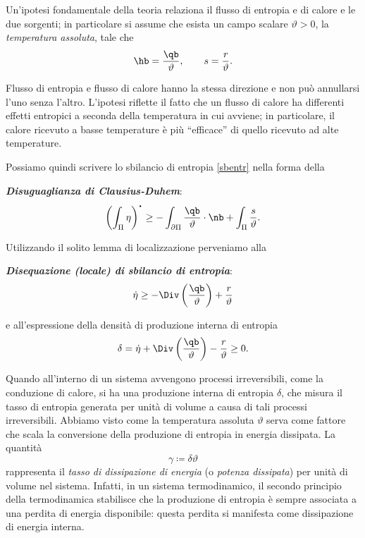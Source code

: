 Un'ipotesi fondamentale della teoria relaziona il flusso di entropia e di calore e le due sorgenti; in particolare si assume che esista un campo scalare $\vartheta>0$, la \textit{temperatura assoluta}, tale
 che
 \begin{equation}
 \hb =\frac{\qb}{\vartheta}, \qquad s=\frac{r}{\vartheta}.
 \end{equation}
 
 Flusso di entropia e flusso di calore hanno la stessa direzione e non può annullarsi l'uno senza l'altro. L'ipotesi riflette il fatto che un flusso di calore ha differenti effetti entropici a seconda della temperatura in cui avviene; in particolare, il calore ricevuto a basse temperature è più ``efficace'' di quello ricevuto ad alte temperature.
 
 Possiamo quindi scrivere lo sbilancio di entropia \eqref{sbentr} nella forma della
 
 \begin{definition}
 \noindent \textbf{\textit{Disuguaglianza di Clausius-Duhem}}:
 \begin{equation}
 	\left( \int_{\Pi}\eta \right)^{\mathop{\vcenter{\hbox{\Large$\cdot$}}}}\geq -\int_{\partial\Pi}\frac{\qb}{\vartheta} \cdot \nb +\int_{\Pi} \frac{s}{\vartheta}.
 \end{equation}
 \end{definition}
 
 Utilizzando il solito lemma di localizzazione perveniamo alla 
 \begin{definition}
\textbf{\textit{Disequazione (locale) di sbilancio di entropia}}:
\begin{equation}
	\dot \eta \geq -\Div \left( \frac{\qb}{\vartheta} \right)+\frac{r}{\vartheta}
\end{equation}
 \end{definition}
 e all'espressione della densità di produzione interna di entropia
 \begin{equation}\label{delta}
 \delta=\dot{\eta}+\Div \left( \frac{\qb}{\vartheta} \right)-\frac{r}{\vartheta}\geq 0.
 \end{equation}
 
 Quando all'interno di un sistema avvengono processi irreversibili, come la conduzione di calore, si ha una produzione interna di entropia $\delta$, che misura il tasso di entropia generata per unità di volume a causa di tali processi irreversibili. Abbiamo visto come la temperatura assoluta $\vartheta$ serva come fattore che scala la conversione della produzione di entropia in energia dissipata. La quantità
\begin{equation}
\gamma\coloneqq\delta\vartheta
\end{equation}
rappresenta il \textit{tasso di dissipazione di energia} (o \textit{potenza dissipata}) per unità di volume nel sistema. Infatti, in un sistema termodinamico, il secondo principio della termodinamica stabilisce che la produzione di entropia è sempre associata a una perdita di energia disponibile: questa perdita si manifesta come dissipazione di energia interna.

